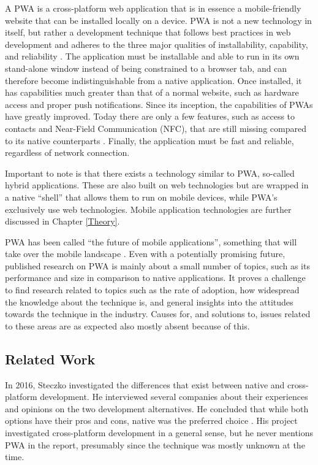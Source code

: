 \documentclass[a4paper,12pt]{article}
\begin{document}
A PWA is a cross-platform web application that is in essence a mobile-friendly website that can be installed locally on a device. PWA is not a new technology in itself, but rather a development technique that follows best practices in web development and adheres to the three major qualities of installability, capability, and reliability \cite{whatarepwas}. The application must be installable and able to run in its own stand-alone window instead of being constrained to a browser tab, and can therefore become indistinguishable from a native application. Once installed, it has capabilities much greater than that of a normal website, such as hardware access and proper push notifications. Since its inception, the capabilities of PWAs have greatly improved. Today there are only a few features, such as access to contacts and Near-Field Communication (NFC), that are still missing compared to its native counterparts \cite{whatwebcando}. Finally, the application must be fast and reliable, regardless of network connection.

Important to note is that there exists a technology similar to PWA, so-called hybrid applications. These are also built on web technologies but are wrapped in a native “shell” that allows them to run on mobile devices, while PWA’s exclusively use web technologies. Mobile application technologies are further discussed in Chapter \ref{Theory}.

PWA has been called “the future of mobile applications”, something that will take over the mobile landscape \cite{casestudies_mia, futureofweb_claim1}. Even with a potentially promising future, published research on PWA is mainly about a small number of topics, such as its performance and size in comparison to native applications. It proves a challenge to find research related to topics such as the rate of adoption, how widespread the knowledge about the technique is, and general insights into the attitudes towards the technique in the industry. Causes for, and solutions to, issues related to these areas are as expected also mostly absent because of this.

\subsection{Related Work}
\label{Intro_relatedWork}
In 2016, Steczko \cite{thesis_steczko} investigated the differences that exist between native and cross-platform development. He interviewed several companies about their experiences and opinions on the two development alternatives. He concluded that while both options have their pros and cons, native was the preferred choice . His project investigated cross-platform development in a general sense, but he never mentions PWA in the report, presumably since the technique was mostly unknown at the time.
\end{document}
